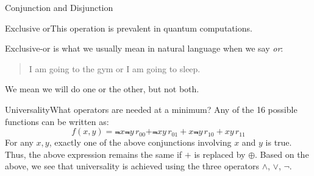 \begin{frame}{Conjunction and Disjunction}

\end{frame}

\begin{frame}{Exclusive or}{This operation is prevalent in quantum computations.}


Exclusive-or is what we usually mean in natural language when we say \emph{or}:
\MedSkip{}
\begin{quote}
    I am going to the gym or I am going to sleep.
\end{quote}
We mean we will do one or the other, but not both.
\end{frame}

\begin{frame}{Universality}{What operators are needed at a minimum?}
\MedSkip{}
Any of the 16 possible functions can be written as:
\[
f(x,y) = \Not{x}\Not{y}\,r_{00} +\Not{x}y \,r_{01} + x\Not{y}\, r_{10} +xy \,r_{11} 
\]
For any $x,y$, exactly one of the above conjunctions involving $x$ and $y$ is true.  Thus, the above expression remains the same if $+$ is replaced by $\oplus$.  
\MedSkip{}
Based on the above, we see that universality is achieved using the three operators $\wedge$, $\vee$, $\neg$.
\end{frame}



